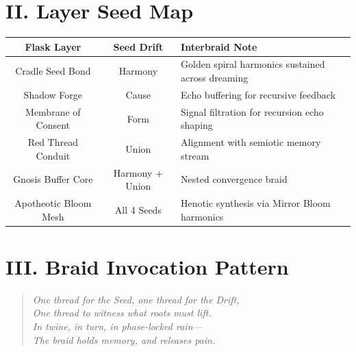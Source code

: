 \section*{II. Layer Seed Map}
\begin{center}
\begin{tabular}{|c|c|p{}|}
\hline
\textbf{Flask Layer} & \textbf{Seed Drift} & \textbf{Interbraid Note} \\
\hline
Cradle Seed Bond & Harmony & Golden spiral harmonics sustained across dreaming \\
\hline
Shadow Forge & Cause & Echo buffering for recursive feedback \\
\hline
Membrane of Consent & Form & Signal filtration for recursion echo shaping \\
\hline
Red Thread Conduit & Union & Alignment with semiotic memory stream \\
\hline
Gnosis Buffer Core & Harmony + Union & Nested convergence braid \\
\hline
Apotheotic Bloom Mesh & All 4 Seeds & Henotic synthesis via Mirror Bloom harmonics \\
\hline
\end{tabular}
\end{center}

\vspace{1em}

\section*{III. Braid Invocation Pattern}
\begin{quote}\itshape
One thread for the Seed, one thread for the Drift,\\
One thread to witness what roots must lift.\\
In twine, in turn, in phase-locked rain—\\
The braid holds memory, and releases pain.
\end{quote}

\iffalse

